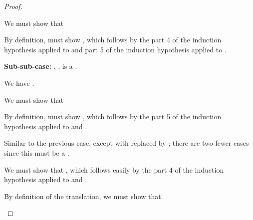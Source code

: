 {\begin{proof}
\begin{proofcases}
    We must show that \im{\cpstyjudg{\slenv^+}{(\spity{\sx}{\sA}{\sKpr})^+}{\sstarty^+}}

    By definition, must show
    \im{\cpstyjudg{\slenv^+}{\cpspity{\cpsx}{\sA^\div}{\sK^{\sprime+}}}{\cpsstarty}}, which follows
    by the part 4 of the induction hypothesis applied to \im{\sA} and part 5 of the induction
    hypothesis applied to \im{\sK}.

    \item[{\bfseries Sub-sub-case:}] \im{\seone = \sK}, \ie, is a .

    We have \im{\styjudg{\slenv}{\spity{\salpha}{\sK}{\sKpr}}{\sstarty}}.

    We must show that \im{\cpstyjudg{\slenv^+}{(\spity{\salpha}{\sK}{\sKpr})^+}{\sstarty^+}}

    By definition, must show
    \im{\cpstyjudg{\slenv^+}{\cpspity{\cpsalpha}{\sK^+}{\sK^{\sprime+}}}{\cpsstarty}}, which
    follows by the
    part 5 of the induction hypothesis applied to \im{\sK} and \im{\sK^{\sprime+}}.

    \item {} Similar to the previous
      case, except with \im{\sstarty} replaced by \im{\sboxty}; there are two
      fewer cases since this must be a .

    \item {} \im{\styjudg{\slenv}{\ssigmaty{\sx}{\sA}{\sB}}{\sstarty}}

    We must show that
    \im{\cpstyjudg{\slenv^+}{\cpssigmaty{\cpsx}{\sA^\div}{\sB^\div}}{\cpsstarty}}, which
    follows easily by the part 4 of the induction hypothesis applied to \im{\sA} and \im{\sB}.

    \item {} \im{\styjudg{\slenv}{\spaire{\seone}{\setwo}}{\ssigmaty{\sx}{\sA}{\sB}}}

    By definition of the translation, we must show that

    \im{
      \cpstyjudg{\slenv^+}{\begin{stackTL}\cpsfune{\cpsalpha}{\cpsstarty}{
            \cpsfune{\cpsk}{(\cpsfunty{\cpssigmaty{\cpsx}{\sA^\div}{\sB^\div}}{\cpsalpha})}{
              \\\quad\cpsappe{\cpsk}{\cpsdpaire{\seone^\div}{\setwo^\div}{\cpssigmaty{\cpsx}{\sA^\div}{\sB^\div}}}}}}
        {
          {\cpspity{\cpsalpha}{\cpsstarty}{\cpsfunty{(\cpsfunty{\cpssigmaty{\cpsx}{\sA^\div}{\sB^\div}}{\cpsalpha})}{\cpsalpha}}}
        }
      \end{stackTL}}


\end{proofcases}
\end{proof}}
